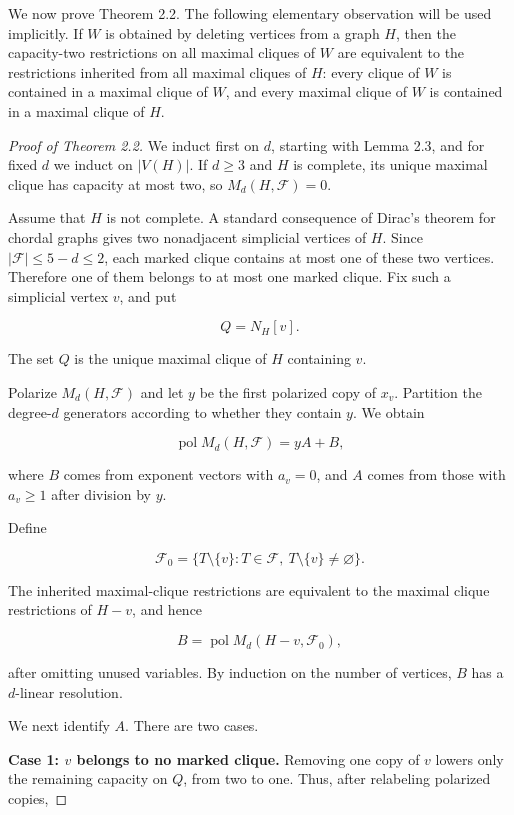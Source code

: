 \documentclass[11pt]{article}
\theoremstyle{definition}
\theoremstyle{remark}
\numberwithin{equation}{section}
\begin{document}
We now prove Theorem 2.2. The following elementary observation will be used
implicitly. If $W$ is obtained by deleting vertices from a graph $H$, then
the capacity-two restrictions on all maximal cliques of $W$ are equivalent to
the restrictions inherited from all maximal cliques of $H$: every clique of
$W$ is contained in a maximal clique of $W$, and every maximal clique of $W$
is contained in a maximal clique of $H$.

\begin{proof}[Proof of Theorem 2.2]

We induct first on $d$, starting with Lemma 2.3, and for fixed $d$ we induct
on $|V(H)|$. If $d\geq3$ and $H$ is complete, its unique maximal clique has
capacity at most two, so $M_d(H,\mathcal F)=0$.

Assume that $H$ is not complete. A standard consequence of Dirac's theorem
for chordal graphs \cite{dirac1961} gives two nonadjacent simplicial vertices of $H$. Since
$|\mathcal F|\leq5-d\leq2$, each marked clique contains at most one of these
two vertices. Therefore one of them belongs to at most one marked clique.
Fix such a simplicial vertex $v$, and put

\nopagebreak[4]
\[
Q=N_H[v].
\]

The set $Q$ is the unique maximal clique of $H$ containing $v$.

Polarize $M_d(H,\mathcal F)$ and let $y$ be the first polarized copy of
$x_v$. Partition the degree-$d$ generators according to whether they contain
$y$. We obtain

\nopagebreak[4]
\[
\operatorname{pol} M_d(H,\mathcal F)=yA+B,
\tag{3.1}
\]

where $B$ comes from exponent vectors with $a_v=0$, and $A$ comes from those
with $a_v\geq1$ after division by $y$.

Define

\nopagebreak[4]
\[
\mathcal F_0
=
\{T\setminus\{v\}:T\in\mathcal F,
\ T\setminus\{v\}\neq\varnothing\}.
\]

The inherited maximal-clique restrictions are equivalent to the maximal
clique restrictions of $H-v$, and hence

\nopagebreak[4]
\[
B=\operatorname{pol}M_d(H-v,\mathcal F_0),
\tag{3.2}
\]

after omitting unused variables. By induction on the number of vertices, $B$
has a $d$-linear resolution.

We next identify $A$. There are two cases.

\textbf{Case 1: $v$ belongs to no marked clique.} Removing one copy of $v$ lowers
only the remaining capacity on $Q$, from two to one. Thus, after relabeling
polarized copies,


\end{proof}
\end{document}
